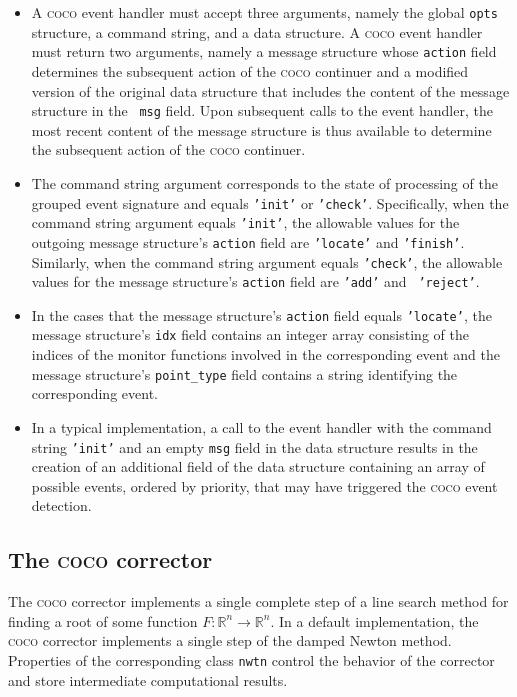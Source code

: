 \documentclass{article}
\begin{document}
\begin{itemize}
\item A \textsc{coco} event handler must accept three arguments, namely the
global \texttt{opts} structure, a command string, and a data structure. A 
\textsc{coco} event handler must return two arguments, namely a message
structure whose \texttt{action} field determines the subsequent action of
the \textsc{coco} continuer and a modified version of the original data
structure that includes the content of the message structure in the \texttt{%
msg} field. Upon subsequent calls to the event handler, the most recent
content of the message structure is thus available to determine the
subsequent action of the \textsc{coco} continuer.

\item The command string argument corresponds to the state of processing of
the grouped event signature and equals \texttt{'init'} or \texttt{'check'}.
Specifically, when the command string argument equals \texttt{'init'}, the
allowable values for the outgoing message structure's \texttt{action} field
are \texttt{'locate'} and \texttt{'finish'}. Similarly, when the command
string argument equals \texttt{'check'}, the allowable values for the
message structure's \texttt{action} field are \texttt{'add'} and \texttt{%
'reject'}.

\item In the cases that the message structure's \texttt{action} field equals 
\texttt{'locate'}, the message structure's \texttt{idx} field contains an
integer array consisting of the indices of the monitor functions involved in
the corresponding event and the message structure's \texttt{point\_type}
field contains a string identifying the corresponding event.

\item In a typical implementation, a call to the event handler with the
command string \texttt{'init'} and an empty \texttt{msg} field in the data
structure results in the creation of an additional field of the data
structure containing an array of possible events, ordered by priority, that
may have triggered the \textsc{coco} event detection.
\end{itemize}

\subsection{The \textsc{coco} corrector}

The \textsc{coco} corrector implements a single complete step of a line
search method for finding a root of some function $F:\mathbb{R}%
^{n}\rightarrow \mathbb{R}^{n}$. In a default implementation, the \textsc{%
coco} corrector implements a single step of the damped Newton method.
Properties of the corresponding class \texttt{nwtn} control the behavior of
the corrector and store intermediate computational results.
\end{document}
